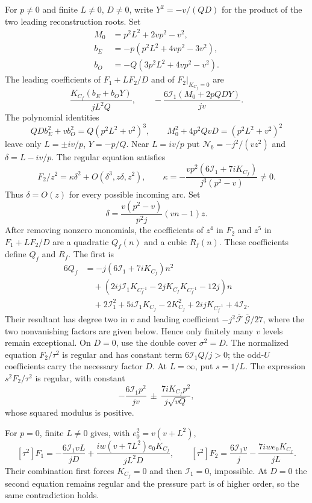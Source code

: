 \documentclass[11pt,a4paper]{article}
\numberwithin{equation}{section}
\theoremstyle{plain}
\theoremstyle{definition}
\theoremstyle{remark}
\begin{document}
For $p\ne0$ and finite $L\ne0$, $D\ne0$, write
$Y^2=-v/(QD)$ for the product of the two leading reconstruction roots.
Set
\[
 \begin{aligned}
 M_0&=p^2L^2+2vp^2-v^2,\\
 b_E&=-p(p^2L^2+4vp^2-3v^2),\\
 b_O&=-Q(3p^2L^2+4vp^2-v^2).
 \end{aligned}
\]
The leading coefficients of $F_1+LF_2/D$ and of $F_2|_{K_{C_f}=0}$ are
\[
 \frac{K_{C_f}(b_E+b_OY)}{jL^2Q},\qquad
 -\frac{6\mathcal I_1(M_0+2pQDY)}{jv}.
\]
The polynomial identities
\[
 QDb_E^2+vb_O^2=Q(p^2L^2+v^2)^3,\qquad
 M_0^2+4p^2QvD=(p^2L^2+v^2)^2
\]
leave only $L=\pm iv/p$, $Y=-p/Q$.  Near $L=iv/p$ put
$\mathcal N_b=-j^2/(vz^2)$ and $\delta=L-iv/p$. The regular equation satisfies
\[
 F_2/z^2=\kappa\delta^2+O(\delta^3,z\delta,z^2),\qquad
 \kappa=-\frac{vp^2(6\mathcal I_1+7iK_{C_f})}{j^3(p^2-v)}\ne0.
\]
Thus $\delta=O(z)$ for every possible incoming arc.  Set
\[
 \delta=\frac{v(p^2-v)}{p^2j}(vn-1)z.
\]
After removing nonzero monomials, the coefficients of $z^4$ in $F_2$
and $z^5$ in $F_1+LF_2/D$ are a quadratic $Q_f(n)$ and a cubic $R_f(n)$.
These coefficients define $Q_f$ and $R_f$.  The first is
\[
 \begin{aligned}
 6Q_f&=-j(6\mathcal I_1+7iK_{C_f})n^2\\
 &\quad +(2ij\mathcal I_1K_{C_f^{-1}}-2jK_{C_f}K_{C_f^{-1}}-12j)n\\
 &\quad +2\mathcal I_1^2+5i\mathcal I_1K_{C_f}-2K_{C_f}^2+2ijK_{C_f^{-1}}+4\mathcal I_2.
 \end{aligned}
\]
Their resultant has degree two in $v$ and leading coefficient
$-j^2\overline{\mathcal F}\,\overline{\mathcal G}/27$, where the two
nonvanishing factors are given below.  Hence only finitely many $v$ levels
remain exceptional.  
On $D=0$, use the double cover $\sigma^2=D$.
The normalized equation $F_2/\tau^2$ is regular and has constant term
$6\mathcal I_1Q/j>0$; the odd-$U$ coefficients carry the necessary factor $D$.
At $L=\infty$, put $s=1/L$.  The expression $s^2F_2/\tau^2$
is regular, with constant
\[
 -\frac{6\mathcal I_1p^2}{jv}\ \pm\ \frac{7iK_{C_f}p^2}{j\sqrt{vQ}},
\]
whose squared modulus is positive.  

For $p=0$, finite $L\ne0$ gives, with $e_0^2=v(v+L^2)$,
\[
 [\tau^2]F_1=-\frac{6\mathcal I_1vL}{jD}
       +\frac{iw(v+7L^2)e_0K_{C_f}}{jL^2D},\qquad
 [\tau^2]F_2=\frac{6\mathcal I_1v}{j}-\frac{7iwe_0K_{C_f}}{jL}.
\]
Their combination first forces $K_{C_f}=0$ and then $\mathcal I_1=0$, impossible.
At $D=0$ the second equation remains regular and the pressure part is of
higher order, so the same contradiction holds.  
\end{document}
